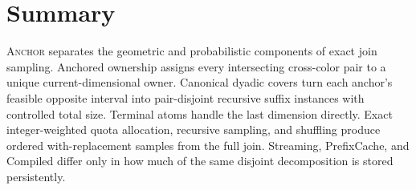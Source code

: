 \documentclass[11pt]{article}
\DeclareRobustCommand{\ANCHOR}{\textnormal{\textsc{Anchor}}}
\theoremstyle{definition}
\begin{document}
\section{Summary}
\label{sec:summary}

\ANCHOR{} separates the geometric and probabilistic components of exact join sampling.  Anchored ownership assigns every intersecting cross-color pair to a unique current-dimensional owner.  Canonical dyadic covers turn each anchor's feasible opposite interval into pair-disjoint recursive suffix instances with controlled total size.  Terminal atoms handle the last dimension directly.  Exact integer-weighted quota allocation, recursive sampling, and shuffling produce ordered with-replacement samples from the full join.  Streaming, PrefixCache, and Compiled differ only in how much of the same disjoint decomposition is stored persistently.
\end{document}
